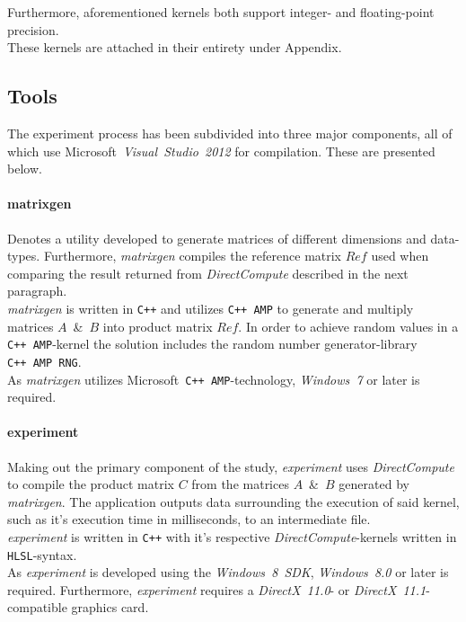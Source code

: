 \documentclass[fleqn,10pt]{SelfArx} %
\begin{document}
\noindent
Furthermore, aforementioned kernels both support integer- and floating-point precision.\\
These kernels are attached in their entirety under Appendix.

\subsection{Tools}
\label{sec:contribution:tools}
The experiment process has been subdivided into three major components, all of which use Microsoft~\textit{Visual~Studio~2012} for compilation. These are presented below.

\paragraph{matrixgen}
Denotes a utility developed to generate matrices of different dimensions and data-types. Furthermore, \textit{matrixgen} compiles the reference matrix $Ref$ used when comparing the result returned from \textit{DirectCompute} described in the next paragraph. \\
\textit{matrixgen} is written in \texttt{C++} and utilizes \texttt{C++~AMP} to generate and multiply matrices $A$~\&~$B$ into product matrix $Ref$. In order to achieve random values in a \texttt{C++~AMP}-kernel the solution includes the random number generator-library \texttt{C++~AMP~RNG}.\\
As \textit{matrixgen} utilizes Microsoft~\texttt{C++~AMP}-technology, \textit{Windows~7} or later is required.

\paragraph{experiment}
Making out the primary component of the study, \textit{experiment} uses \textit{DirectCompute} to compile the product matrix $C$ from the matrices $A$~\&~$B$ generated by \textit{matrixgen}. The application outputs data surrounding the execution of said kernel, such as it's execution time in milliseconds, to an intermediate file.\\
\textit{experiment} is written in \texttt{C++} with it's respective \textit{DirectCompute}-kernels written in \texttt{HLSL}-syntax.\\
As \textit{experiment} is developed using the \textit{Windows~8~SDK}, \textit{Windows~8.0} or later is required. Furthermore, \textit{experiment} requires a \textit{DirectX~11.0}- or \textit{DirectX~11.1}-compatible graphics card.
\end{document}
